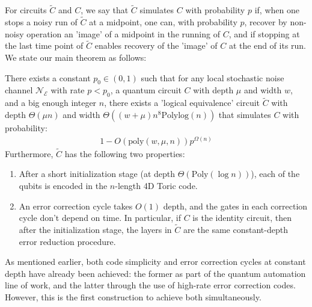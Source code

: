 For circuits $\tilde{C}$ and $C$, we say that $\tilde{C}$ simulates $C$ with probability $p$ if, when one stops a noisy run of $\tilde{C}$ at a midpoint, one can, with probability $p$, recover by non-noisy operation an 'image' of a midpoint in the running of $C$, and if stopping at the last time point of $\tilde{C}$ enables recovery of the 'image' of $C$ at the end of its run. We state our main theorem as follows:
\begin{theorem*}
  There exists a constant $p_{0} \in (0,1)$ such that for any local stochastic noise channel $\mathcal{N}_{\mathcal{E}}$ with rate $p < p_{0}$, a quantum circuit $C$ with depth $\mu$ and width $w$, and a big enough integer $n$, there exists a 'logical equivalence' circuit $\tilde{C}$ with depth $\Theta(\mu n)$ and width $\Theta((w + \mu) n^{8} \text{Polylog} (n) )$ that simulates $C$ with probability:
\begin{equation*}
  \begin{split}
    1 -   O \left( \text{poly}(w,\mu,n) \right)  p^{\Omega(n)} 
  \end{split}
\end{equation*}
Furthermore, $\tilde{C}$ has the following two properties:
\begin{enumerate}
  \item After a short initialization stage (at depth $\Theta( \text{Poly}(\log n))$), each of the qubits is encoded in the $n$-length 4D Toric code.
  \item An error correction cycle takes $O(1)$ depth, and the gates in each correction cycle don't depend on time. In particular, if $C$ is the identity circuit, then after the initialization stage, the layers in $\tilde{C}$ are the same constant-depth error reduction procedure.
\end{enumerate}
  \end{theorem*} 
As mentioned earlier, both code simplicity and error correction cycles at constant depth have already been achieved: the former as part of the quantum automation line of work, and the latter through the use of high-rate error correction codes. However, this is the first construction to achieve both simultaneously. %


